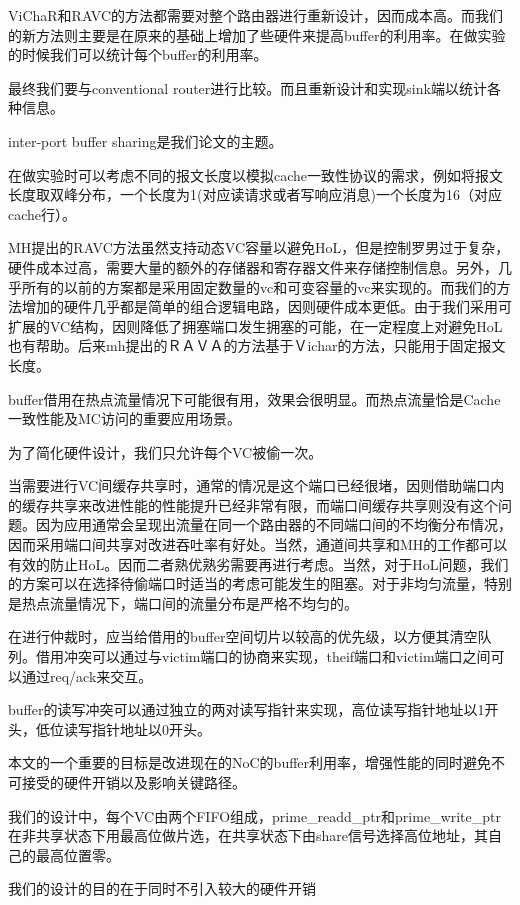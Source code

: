 ﻿\documentclass[10pt,journal]{IEEEtran}
\begin{document}
ViChaR和RAVC的方法都需要对整个路由器进行重新设计，因而成本高。而我们的新方法则主要是在原来的基础上增加了些硬件来提高buffer的利用率。在做实验的时候我们可以统计每个buffer的利用率。

最终我们要与conventional router进行比较。而且重新设计和实现sink端以统计各种信息。

inter-port buffer sharing是我们论文的主题。

在做实验时可以考虑不同的报文长度以模拟cache一致性协议的需求，例如将报文长度取双峰分布，一个长度为1(对应读请求或者写响应消息)一个长度为16（对应cache行）。

MH提出的RAVC方法虽然支持动态VC容量以避免HoL，但是控制罗男过于复杂，硬件成本过高，需要大量的额外的存储器和寄存器文件来存储控制信息。另外，几乎所有的以前的方案都是采用固定数量的vc和可变容量的vc来实现的。而我们的方法增加的硬件几乎都是简单的组合逻辑电路，因则硬件成本更低。由于我们采用可扩展的VC结构，因则降低了拥塞端口发生拥塞的可能，在一定程度上对避免HoL也有帮助。后来mh提出的ＲＡＶＡ的方法基于Ｖichar的方法，只能用于固定报文长度。

buffer借用在热点流量情况下可能很有用，效果会很明显。而热点流量恰是Cache一致性能及MC访问的重要应用场景。

为了简化硬件设计，我们只允许每个VC被偷一次。

当需要进行VC间缓存共享时，通常的情况是这个端口已经很堵，因则借助端口内的缓存共享来改进性能的性能提升已经非常有限，而端口间缓存共享则没有这个问题。因为应用通常会呈现出流量在同一个路由器的不同端口间的不均衡分布情况，因而采用端口间共享对改进吞吐率有好处。当然，通道间共享和MH的工作都可以有效的防止HoL。因而二者熟优熟劣需要再进行考虑。当然，对于HoL问题，我们的方案可以在选择待偷端口时适当的考虑可能发生的阻塞。对于非均匀流量，特别是热点流量情况下，端口间的流量分布是严格不均匀的。

在进行仲裁时，应当给借用的buffer空间切片以较高的优先级，以方便其清空队列。借用冲突可以通过与victim端口的协商来实现，theif端口和victim端口之间可以通过req/ack来交互。

buffer的读写冲突可以通过独立的两对读写指针来实现，高位读写指针地址以1开头，低位读写指针地址以0开头。

本文的一个重要的目标是改进现在的NoC的buffer利用率，增强性能的同时避免不可接受的硬件开销以及影响关键路径。

我们的设计中，每个VC由两个FIFO组成，prime\_readd\_ptr和prime\_write\_ptr在非共享状态下用最高位做片选，在共享状态下由share信号选择高位地址，其自己的最高位置零。

我们的设计的目的在于同时不引入较大的硬件开销
\end{document}
